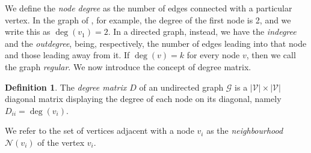 \documentclass[12pt,a4paper]{report}
\theoremstyle{definition}
\newtheorem{definition}{Definition}[chapter]
\begin{document}
We define the \emph{node degree} as the number of edges connected with a particular vertex.
In the graph of , for example, the degree of the first node is 2, and we write this as $\deg(v_1)=2$.
In a directed graph, instead, we have the \emph{indegree} and the \emph{outdegree}, being, respectively, the number of edges leading into that node and those leading away from it.
If $\deg(v)=k$ for every node $v$, then we call the graph \emph{regular}.
We now introduce the concept of degree matrix.
\begin{definition}
The \emph{degree matrix $D$} of an undirected graph $\mathcal{G}$ is a $|\mathcal{V}| \times |\mathcal{V}|$ diagonal matrix displaying the degree of each node on its diagonal, namely $D_{ii} = \deg(v_i).$
\end{definition}

We refer to the set of vertices adjacent with a node $v_i$ as the \emph{neighbourhood $\mathcal{N}\left( v_i \right)$} of the vertex $v_i$.
\end{document}
